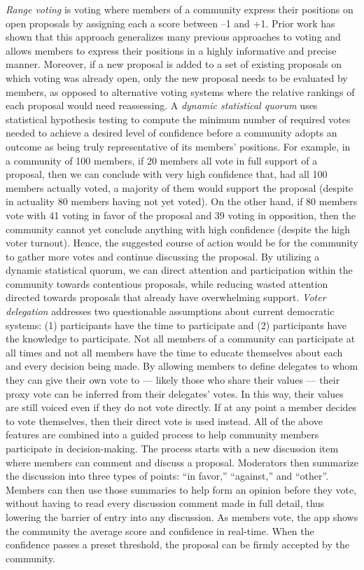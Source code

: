 \documentclass[format=acmsmall, review=true, screen=true, anonymous=true]{acmart}
\begin{document}
\textit{Range voting} is voting where members of a community express their positions on open proposals by assigning each a score between –1 and +1. Prior work has shown that this approach generalizes many previous approaches to voting and allows members to express their positions in a highly informative and precise manner. Moreover, if a new proposal is added to a set of existing proposals on which voting was already open, only the new proposal needs to be evaluated by members, as opposed to alternative voting systems where the relative rankings of each proposal would need reassessing.
A \textit{dynamic statistical quorum} uses statistical hypothesis testing to compute the minimum number of required votes needed to achieve a desired level of confidence before a community adopts an outcome as being truly representative of its members’ positions. For example, in a community of 100 members, if 20 members all vote in full support of a proposal, then we can conclude with very high confidence that, had all 100 members actually voted, a majority of them would support the proposal (despite in actuality 80 members having not yet voted). On the other hand, if 80 members vote with 41 voting in favor of the proposal and 39 voting in opposition, then the community cannot yet conclude anything with high confidence (despite the high voter turnout). Hence, the suggested course of action would be for the community to gather more votes and continue discussing the proposal. By utilizing a dynamic statistical quorum, we can direct attention and participation within the community towards contentious proposals, while reducing wasted attention directed towards proposals that already have overwhelming support.
\textit{Voter delegation} addresses two questionable assumptions about current democratic systems: (1) participants have the time to participate and (2) participants have the knowledge to participate. Not all members of a community can participate at all times and not all members have the time to educate themselves about each and every decision being made. By allowing members to define delegates to whom they can give their own vote to — likely those who share their values — their proxy vote can be inferred from their delegates’ votes. In this way, their values are still voiced even if they do not vote directly. If at any point a member decides to vote themselves, then their direct vote is used instead.
All of the above features are combined into a guided process to help community members participate in decision-making. The process starts with a new discussion item where members can comment and discuss a proposal. Moderators then summarize the discussion into three types of points: “in favor,” “against,” and “other”. Members can then use those summaries to help form an opinion before they vote, without having to read every discussion comment made in full detail, thus lowering the barrier of entry into any discussion. As members vote, the app shows the community the average score and confidence in real-time. When the confidence passes a preset threshold, the proposal can be firmly accepted by the community.
\end{document}
